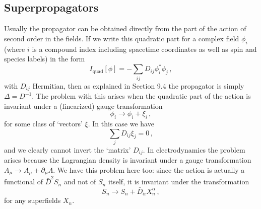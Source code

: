 
\subsection{Superpropagators}

Usually the propagator can be obtained directly from the part of the action
of second order in the fields. If we write this quadratic part for a complex
field \(\phi_i\) (where \(i\) is a compound index including spacetime
coordinates as well as spin and species labels) in the form
\begin{equation}
  I_{\mathrm{quad}}[\phi]
  =-\sum_{ij}D_{ij}\phi_i^*\phi_j\,,
  \tag{30.2.1}\label{eq:30.2.1}
\end{equation}
with \(D_{ij}\) Hermitian, then as explained in Section 9.4 the propagator is
simply \(\Delta=D^{-1}\). The problem with this arises when the quadratic
part of the action is invariant under a (linearized) gauge transformation
\begin{equation}
  \phi_i\longrightarrow\phi_i+\xi_i\,,
  \tag{30.2.2}\label{eq:30.2.2}
\end{equation}
for some class of `vectors' \(\xi\). In this case we have
\begin{equation}
  \sum_jD_{ij}\xi_j=0\,,
  \tag{30.2.3}\label{eq:30.2.3}
\end{equation}
and we clearly cannot invert the `matrix' \(D_{ij}\). In electrodynamics the
problem arises because the Lagrangian density is invariant under a gauge
transformation \(A_\mu\longrightarrow A_\mu+\partial_\mu\Lambda\). We have
this problem here too: since the action is actually a functional of
\(\bar D^2S_n\) and not of \(S_n\) itself, it is invariant under the
transformation
\begin{equation}
  S_n\longrightarrow S_n+\bar D_{\dot\alpha}X_n^{\dot\alpha}\,,
  \tag{30.2.4}\label{eq:30.2.4}
\end{equation}
for any superfields \(X_n\).

